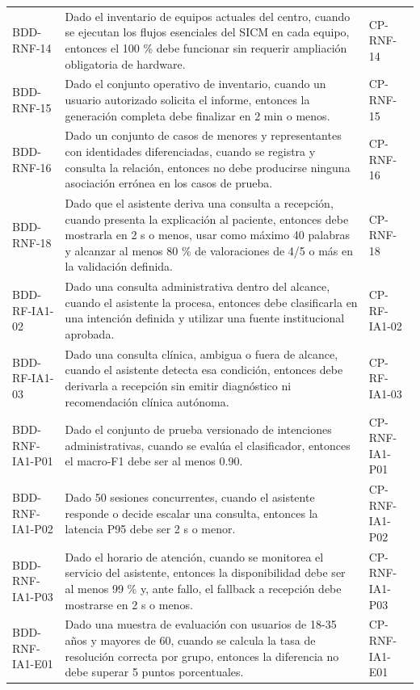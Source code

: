 \documentclass[11pt,a4paper]{article}
\begin{document}
\begin{appendices}
\begin{longtable}{p{2.8cm}p{10.6cm}p{2cm}}
			BDD-RNF-14 & Dado el inventario de equipos actuales del centro, cuando se ejecutan los flujos esenciales del SICM en cada equipo, entonces el 100 \% debe funcionar sin requerir ampliación obligatoria de hardware. & CP-RNF-14\\
			BDD-RNF-15 & Dado el conjunto operativo de inventario, cuando un usuario autorizado solicita el informe, entonces la generación completa debe finalizar en 2 min o menos. & CP-RNF-15\\
			BDD-RNF-16 & Dado un conjunto de casos de menores y representantes con identidades diferenciadas, cuando se registra y consulta la relación, entonces no debe producirse ninguna asociación errónea en los casos de prueba. & CP-RNF-16\\
			BDD-RNF-18 & Dado que el asistente deriva una consulta a recepción, cuando presenta la explicación al paciente, entonces debe mostrarla en 2 s o menos, usar como máximo 40 palabras y alcanzar al menos 80 \% de valoraciones de 4/5 o más en la validación definida. & CP-RNF-18\\
			BDD-RF-IA1-02 & Dado una consulta administrativa dentro del alcance, cuando el asistente la procesa, entonces debe clasificarla en una intención definida y utilizar una fuente institucional aprobada. & CP-RF-IA1-02\\
			BDD-RF-IA1-03 & Dado una consulta clínica, ambigua o fuera de alcance, cuando el asistente detecta esa condición, entonces debe derivarla a recepción sin emitir diagnóstico ni recomendación clínica autónoma. & CP-RF-IA1-03\\
			BDD-RNF-IA1-P01 & Dado el conjunto de prueba versionado de intenciones administrativas, cuando se evalúa el clasificador, entonces el macro-F1 debe ser al menos 0.90. & CP-RNF-IA1-P01\\
			BDD-RNF-IA1-P02 & Dado 50 sesiones concurrentes, cuando el asistente responde o decide escalar una consulta, entonces la latencia P95 debe ser 2 s o menor. & CP-RNF-IA1-P02\\
			BDD-RNF-IA1-P03 & Dado el horario de atención, cuando se monitorea el servicio del asistente, entonces la disponibilidad debe ser al menos 99 \% y, ante fallo, el fallback a recepción debe mostrarse en 2 s o menos. & CP-RNF-IA1-P03\\
			BDD-RNF-IA1-E01 & Dado una muestra de evaluación con usuarios de 18-35 años y mayores de 60, cuando se calcula la tasa de resolución correcta por grupo, entonces la diferencia no debe superar 5 puntos porcentuales. & CP-RNF-IA1-E01\\

\end{longtable}
\end{appendices}
\end{document}
